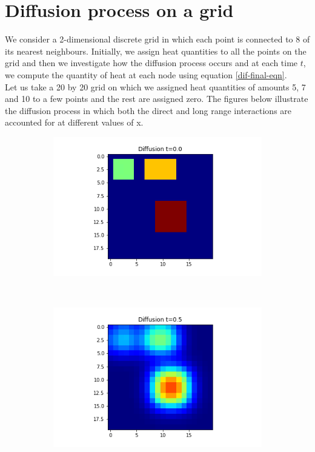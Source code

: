 \documentclass[10pt,a4paper]{article}
\begin{document}
\section{Diffusion process on a grid}
We consider a 2-dimensional discrete grid in which each point is connected to 8 of its nearest neighbours. Initially, we assign heat quantities to all the points on the grid and then we investigate how the diffusion process occurs and at each time $t$, we compute the quantity of heat at each node using equation \ref{dif-final-eqn}. \\
Let us take a 20 by 20 grid on which we assigned heat quantities of amounts 5, 7 and 10 to a few points and the rest are assigned zero. The figures below illustrate the diffusion process in which both the direct and long range interactions are accounted for at different values of x.
\begin{figure}[!h]
	\centering
	\begin{subfigure}[b]{0.25\textwidth}
		\includegraphics[width=\textwidth]{images/grid-t0-x0.png}
	\end{subfigure}~
	\begin{subfigure}[b]{0.25\textwidth}
		\includegraphics[width= \textwidth]{images/grid-t05-x0.png}

\end{subfigure}
\end{figure}
\end{document}

